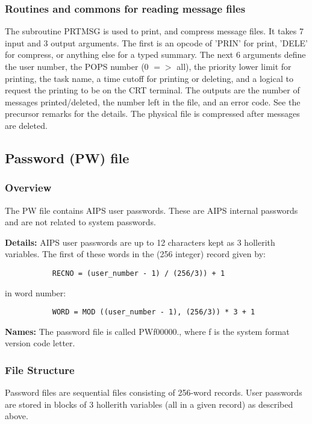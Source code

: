 \subsubsection{Routines and commons for reading message files}

     The subroutine PRTMSG is used to print, and compress message
files.  It takes 7 input and 3 output arguments.  The first is an
opcode of 'PRIN' for print, 'DELE' for compress, or anything else
for a typed summary.  The next 6 arguments define the user number,
the POPS number (0 $=>$ all), the priority lower limit for printing,
the task name, a time cutoff for printing or deleting, and a logical
to request the printing to be on the CRT terminal.  The outputs are
the number of messages printed/deleted, the number left in the file,
and an error code.  See the precursor remarks for the details.  The
physical file is compressed after messages are deleted.

\subsection{Password (PW) file}
\subsubsection{Overview}

   The PW file contains AIPS user passwords.  These are AIPS internal
passwords and are not related to system passwords.

{\bf Details:}  AIPS user passwords are up to 12 characters  kept as 3
hollerith variables.  The first of these words in  the (256 integer)
record given by:
\begin{verbatim}
           RECNO = (user_number - 1) / (256/3)) + 1
\end{verbatim}
in word number:
\begin{verbatim}
           WORD = MOD ((user_number - 1), (256/3)) * 3 + 1
\end{verbatim}

{\bf Names:}  The password file is called PWf00000., where f is the system
format version code letter.

\subsubsection{File Structure}

     Password files are sequential files consisting of 256-word
records.  User passwords are stored in blocks of 3 hollerith variables
(all in a given record) as described above.
